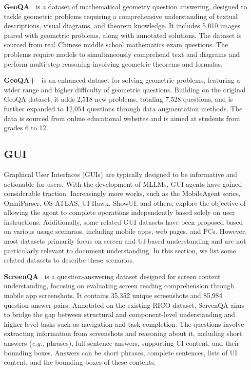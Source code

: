 \noindent \textbf{GeoQA~\cite{chen2021geoqa}} is a dataset of mathematical geometry question answering, designed to tackle geometric problems requiring a comprehensive understanding of textual descriptions, visual diagrams, and theorem knowledge. It includes 5,010 images paired with geometric problems, along with annotated solutions. The dataset is sourced from real Chinese middle school mathematics exam questions. The problems require models to simultaneously comprehend text and diagrams and perform multi-step reasoning involving geometric theorems and formulas.

\noindent \textbf{GeoQA+~\cite{cao2022augmented}} is an enhanced dataset for solving geometric problems, featuring a wider range and higher difficulty of geometric questions. Building on the original GeoQA dataset, it adds 2,518 new problems, totaling 7,528 questions, and is further expanded to 12,054 questions through data augmentation methods. The data is sourced from online educational websites and is aimed at students from grades 6 to 12.

\subsection{GUI}
Graphical User Interfaces (GUIs) are typically designed to be informative and actionable for users. With the development of MLLMs, GUI agents have gained considerable traction. Increasingly more works, such as the MobileAgent series, OmniParser, OS-ATLAS, UI-Hawk, ShowUI, and others, explore the objective of allowing the agent to complete operations independently based solely on user instructions. Additionally, some related GUI datasets have been proposed based on various usage scenarios, including mobile apps, web pages, and PCs. However, most datasets primarily focus on screen and UI-based understanding and are not particularly relevant to document understanding. In this section, we list some related datasets to describe these scenarios.

\noindent \textbf{ScreenQA~\cite{hsiao2022screenqa}} is a question-answering dataset designed for screen content understanding, focusing on evaluating screen reading comprehension through mobile app screenshots. It contains 35,352 unique screenshots and 85,984 question-answer pairs. Annotated on the existing RICO dataset, ScreenQA aims to bridge the gap between structural and component-level understanding and higher-level tasks such as navigation and task completion. The questions involve extracting information from screenshots and reasoning about it, including short answers (\emph{e.g.}, phrases), full sentence answers, supporting UI content, and their bounding boxes. Answers can be short phrases, complete sentences, lists of UI content, and the bounding boxes of these contents.

